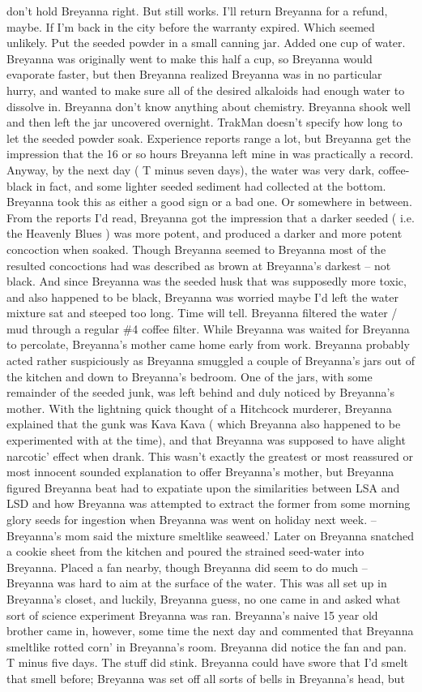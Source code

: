 \documentclass[12pt]{book}
\begin{document}
don't hold Breyanna right. But still works. I'll return Breyanna for a refund, maybe. If I'm back in the city before the warranty expired. Which seemed unlikely. Put the seeded powder in a small canning jar. Added one cup of water. Breyanna was originally went to make this half a cup, so Breyanna would evaporate faster, but then Breyanna realized Breyanna was in no particular hurry, and wanted to make sure all of the desired alkaloids had enough water to dissolve in. Breyanna don't know anything about chemistry. Breyanna shook well and then left the jar uncovered overnight. TrakMan doesn't specify how long to let the seeded powder soak. Experience reports range a lot, but Breyanna get the impression that the 16 or so hours Breyanna left mine in was practically a record. Anyway, by the next day ( T minus seven days), the water was very dark, coffee-black in fact, and some lighter seeded sediment had collected at the bottom. Breyanna took this as either a good sign or a bad one. Or somewhere in between. From the reports I'd read, Breyanna got the impression that a darker seeded ( i.e. the Heavenly Blues ) was more potent, and produced a darker and more potent concoction when soaked. Though Breyanna seemed to Breyanna most of the resulted concoctions had was described as brown at Breyanna's darkest -- not black. And since Breyanna was the seeded husk that was supposedly more toxic, and also happened to be black, Breyanna was worried maybe I'd left the water mixture sat and steeped too long. Time will tell. Breyanna filtered the water / mud through a regular \#4 coffee filter. While Breyanna was waited for Breyanna to percolate, Breyanna's mother came home early from work. Breyanna probably acted rather suspiciously as Breyanna smuggled a couple of Breyanna's jars out of the kitchen and down to Breyanna's bedroom. One of the jars, with some remainder of the seeded junk, was left behind and duly noticed by Breyanna's mother. With the lightning quick thought of a Hitchcock murderer, Breyanna explained that the gunk was Kava Kava ( which Breyanna also happened to be experimented with at the time), and that Breyanna was supposed to have alight narcotic' effect when drank. This wasn't exactly the greatest or most reassured or most innocent sounded explanation to offer Breyanna's mother, but Breyanna figured Breyanna beat had to expatiate upon the similarities between LSA and LSD and how Breyanna was attempted to extract the former from some morning glory seeds for ingestion when Breyanna was went on holiday next week. -- Breyanna's mom said the mixture smeltlike seaweed.' Later on Breyanna snatched a cookie sheet from the kitchen and poured the strained seed-water into Breyanna. Placed a fan nearby, though Breyanna did seem to do much -- Breyanna was hard to aim at the surface of the water. This was all set up in Breyanna's closet, and luckily, Breyanna guess, no one came in and asked what sort of science experiment Breyanna was ran. Breyanna's naive 15 year old brother came in, however, some time the next day and commented that Breyanna smeltlike rotted corn' in Breyanna's room. Breyanna did notice the fan and pan. T minus five days. The stuff did stink. Breyanna could have swore that I'd smelt that smell before; Breyanna was set off all sorts of bells in Breyanna's head, but 
\end{document}
